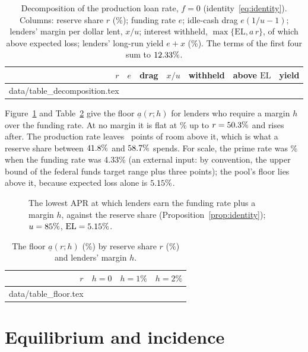 \documentclass[preprint,11pt,authoryear]{elsarticle}
\makeatletter
\theoremstyle{definition}
\newcommand{\inputrows}[1]{\@@input #1 }
\newcommand{\EL}{\mathrm{EL}}
\makeatother
\begin{document}
\begin{table}[ht]
  \centering\small
  \caption{Decomposition of the production loan rate, $f=0$ (identity~\eqref{eq:identity}). Columns: reserve
  share $r$ (\%); funding rate $e$; idle-cash drag $e(1/u-1)$; lenders' margin per dollar lent, $x/u$;
  interest withheld, $\max\{\EL,a\,r\}$, of which above expected loss; lenders' long-run yield $e+x$ (\%). The terms
  of the first four sum to $12.33\%$.}
  \label{tab:decomposition}
  \begin{tabular}{rrrrrrr}
    \toprule
    $r$ & $e$ & drag & $x/u$ & withheld & above $\EL$ & yield \\
    \midrule
    \inputrows{data/table_decomposition.tex}
    \bottomrule
  \end{tabular}
\end{table}

Figure~\ref{fig:floor} and Table~\ref{tab:floor} give the floor $\underline a(r;h)$ for lenders who require a
margin $h$ over the funding rate. At no margin it is flat at \AFreeZero\% up to $r=50.3\%$ and rises after.
The production rate leaves \MarginRoom\ points of room above it, which is what a reserve share between $41.8\%$ and
$58.7\%$ spends. For scale, the prime rate was \PrimeIllus\% when the funding rate was
4.33\% (an external input: by convention, the upper bound of the federal funds target range plus three points); the pool's floor lies
above it, because expected loss alone is $5.15\%$.

\begin{figure}[ht]
  \centering
  
  \caption{The lowest APR at which lenders earn the funding rate plus a margin $h$, against the reserve
  share (Proposition~\ref{prop:identity}); $u=85\%$, $\EL=\ELre\%$.}
  \label{fig:floor}
\end{figure}

\begin{table}[ht]
  \centering\small
  \caption{The floor $\underline a(r;h)$ (\%) by reserve share $r$ (\%) and lenders' margin $h$.}
  \label{tab:floor}
  \begin{tabular}{rrrr}
    \toprule
    $r$ & $h=0$ & $h=1\%$ & $h=2\%$ \\
    \midrule
    \inputrows{data/table_floor.tex}
    \bottomrule
  \end{tabular}
\end{table}

\section{Equilibrium and incidence}\label{sec:eq}
\end{document}
